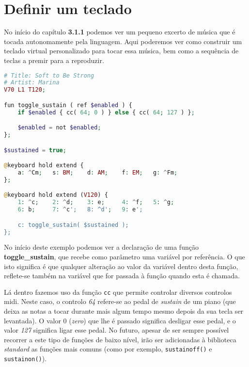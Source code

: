 \section{Definir um teclado}

No início do capítulo \textbf{3.1.1} podemos ver um pequeno excerto de música que é tocada autonomamente pela linguagem. Aqui poderemos ver como construir um teclado virtual personalizado para tocar essa música, bem como a sequência de teclas a premir para a reproduzir.
    
\begin{lstlisting}[caption=Exemplo da sintaxe para criação de teclados,language=PHP]
# Title: Soft to Be Strong
# Artist: Marina
V70 L1 T120;

fun toggle_sustain ( ref $enabled ) {
    if $enabled { cc( 64; 0 ) } else { cc( 64; 127 ) };

    $enabled = not $enabled;
};

$sustained = true;

@keyboard hold extend {
    a: ^Cm;   s: BM;    d: AM;    f: EM;   g: ^Fm;
};

@keyboard hold extend (V120) {
    1: ^c;    2: ^d;    3: e;     4: ^f;   5: ^g;
    6: b;     7: ^c';   8: ^d';   9: e';

    c: toggle_sustain( $sustained );
};
\end{lstlisting}

No início deste exemplo podemos ver a declaração de uma função \textbf{toggle\_sustain}, que recebe como parâmetro uma variável por referência. O que isto significa é que qualquer alteração ao valor da variável dentro desta função, reflete-se também na variável que for passada à função quando esta é chamada. 

Lá dentro fazemos uso da função \texttt{cc} que permite controlar diversos controlos \acrshort{midi}. Neste caso, o controlo \textit{64} refere-se ao pedal de \textit{sustain} de um piano (que deixa as notas a tocar durante mais algum tempo mesmo depois da sua tecla ser levantada). O valor 0 (\textit{zero}) que lhe é passado significa desligar esse pedal, e o valor \textit{127} significa ligar esse pedal. No futuro, apesar de ser sempre possível recorrer a este tipo de funções de baixo nível, irão ser adicionadas à biblioteca \textit{standard} as funções mais comuns (como por exemplo, \texttt{sustainoff()} e \texttt{sustainon()}).

